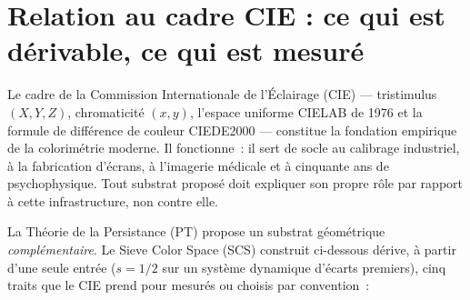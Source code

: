 \documentclass[12pt,a4paper]{article}
\begin{document}
\begin{abstract}
\medskip\noindent\textbf{Invitations ouvertes.} Trois pr\'edictions
falsifiables, chacune r\'ealisable en trois mois d'exp\'erience, sont
\'enonc\'ees en \S\ref{sec:open_problems}~: un test JND nul au point
de saturation de Koide $S/S_{\max} = 1/\sqrt{2}$~; un plafond de
discrimination chromatique \`a $3 \times 5 \times 7 = 105$ \'etats,
motiv\'e par le CRT~; et la signature d'un quatri\`eme canal issu de
$p = 11$ chez les t\'etrachromates. Le code, les d\'ecoupages COMBVD,
les ajustements MacAdam et un classement public sont diffus\'es
\`a \href{https://github.com/Igrekess/SieveColorSpace}{github.com/Igrekess/SieveColorSpace}.
Nous ne pr\'etendons pas que le SCS soit achev\'e~; nous affirmons
qu'il est testable.
Cet article est autonome~: un appendice fournit les d\'erivations
autonomes des r\'esultats de la Th\'eorie de la Persistance utilis\'es
--- transitions interdites du crible, param\`etre $s = 1/2$, r\`egle
de somme, bifurcation sommet--ar\^ete, identit\'e d'holonomie,
dimensions anomales, crit\`ere de premier actif et point fixe
$\mustar = 15$ --- de sorte qu'aucune r\'ef\'erence ext\'erieure n'est
n\'ecessaire pour v\'erifier la cha\^ine d\'eductive.
\end{abstract}

\tableofcontents
\newpage

\section{Relation au cadre CIE : ce qui est d\'erivable, ce qui est mesur\'e}
\label{sec:intro}

Le cadre de la Commission Internationale de l'\'Eclairage (CIE) ---
tristimulus $(X, Y, Z)$, chromaticit\'e $(x, y)$, l'espace uniforme
CIELAB de 1976 et la formule de diff\'erence de couleur CIEDE2000 ---
constitue la fondation empirique de la colorim\'etrie moderne. Il
fonctionne~: il sert de socle au calibrage industriel, \`a la
fabrication d'\'ecrans, \`a l'imagerie m\'edicale et \`a cinquante ans
de psychophysique. Tout substrat propos\'e doit expliquer son propre
r\^ole par rapport \`a cette infrastructure, non contre elle.

La Th\'eorie de la Persistance (PT) propose un substrat g\'eom\'etrique
\emph{compl\'ementaire}. Le Sieve Color Space (SCS) construit
ci-dessous d\'erive, \`a partir d'une seule entr\'ee ($s = 1/2$ sur un
syst\`eme dynamique d'\'ecarts premiers), cinq traits que le CIE prend
pour mesur\'es ou choisis par convention~:
\end{document}
